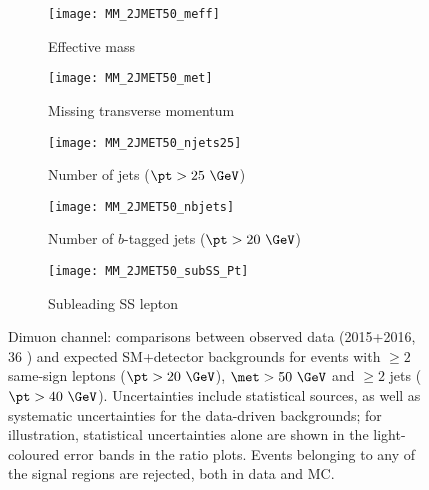 \begin{figure}[t!]
\centering
\begin{subfigure}[t]{0.48\textwidth}
\texttt{[image: MM\_2JMET50\_meff]}
\caption{Effective mass \meff}
\end{subfigure}
\begin{subfigure}[t]{0.48\textwidth}
\texttt{[image: MM\_2JMET50\_met]}
\caption{Missing transverse momentum \met}
\end{subfigure}
\begin{subfigure}[t]{0.48\textwidth}
\texttt{[image: MM\_2JMET50\_njets25]}
\caption{Number of jets ($\pt>25~\GeV$)}
\end{subfigure}
\begin{subfigure}[t]{0.48\textwidth}
\texttt{[image: MM\_2JMET50\_nbjets]}
\caption{Number of $b$-tagged jets ($\pt>20~\GeV$)}
\end{subfigure}
\begin{subfigure}[t]{0.48\textwidth}
\texttt{[image: MM\_2JMET50\_subSS\_Pt]}
\caption{Subleading SS lepton \pt}
\end{subfigure}
\caption{Dimuon channel: comparisons between observed data (2015+2016, 36 \ifb) and expected SM+detector backgrounds 
for events with $\ge 2$ same-sign leptons ($\pt>20~\GeV$), $\met>50~\GeV$ and $\ge 2$ jets ($\pt>40~\GeV$). 
Uncertainties include statistical sources, as well as systematic uncertainties for the data-driven backgrounds; 
for illustration, statistical uncertainties alone are shown in the light-coloured error bands in the ratio plots. 
Events belonging to any of the signal regions are rejected, both in data and MC.  
}
\label{fig:distributions_channelMM_2015}
\end{figure} 

